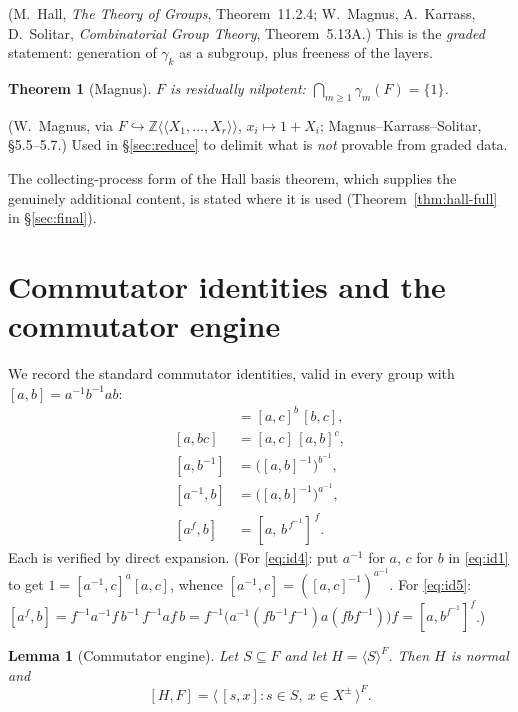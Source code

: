 \documentclass{amsart}
\newtheorem{theorem}{Theorem}
\newtheorem{lemma}{Lemma}
\theoremstyle{definition}
\theoremstyle{remark}
\begin{document}
\noindent
(M.\ Hall, \emph{The Theory of Groups}, Theorem~11.2.4; W.\ Magnus, A.\ Karrass,
D.\ Solitar, \emph{Combinatorial Group Theory}, Theorem~5.13A.) This is the
\emph{graded} statement: generation of $\gamma_k$ as a subgroup, plus freeness of
the layers.

\begin{theorem}[Magnus]\label{thm:magnus}
$F$ is residually nilpotent: $\bigcap_{m\ge1}\gamma_m(F)=\{1\}$.
\end{theorem}

\noindent
(W.\ Magnus, via $F\hookrightarrow\mathbb Z\langle\!\langle X_1,\dots,X_r\rangle
\!\rangle$, $x_i\mapsto 1+X_i$; Magnus--Karrass--Solitar, \S5.5--5.7.) Used in
\S\ref{sec:reduce} to delimit what is \emph{not} provable from graded data.

\noindent
The collecting-process form of the Hall basis theorem, which supplies the
genuinely additional content, is stated where it is used
(Theorem~\ref{thm:hall-full} in \S\ref{sec:final}).

\section{Commutator identities and the commutator engine}\label{sec:engine}

We record the standard commutator identities, valid in every group with
$[a,b]=a^{-1}b^{-1}ab$:
\begin{align}
[ab,c]&=[a,c]^{b}\,[b,c], \label{eq:id1}\\
[a,bc]&=[a,c]\,[a,b]^{c}, \label{eq:id2}\\
[a,b^{-1}]&=\big([a,b]^{-1}\big)^{b^{-1}}, \label{eq:id3}\\
[a^{-1},b]&=\big([a,b]^{-1}\big)^{a^{-1}}, \label{eq:id4}\\
[a^{f},b]&=[a,\,b^{\,f^{-1}}]^{\,f}. \label{eq:id5}
\end{align}
Each is verified by direct expansion. (For \eqref{eq:id4}: put $a^{-1}$ for $a$,
$c$ for $b$ in \eqref{eq:id1} to get $1=[a^{-1},c]^{a}[a,c]$, whence
$[a^{-1},c]=([a,c]^{-1})^{a^{-1}}$. For \eqref{eq:id5}:
$[a^f,b]=f^{-1}a^{-1}f\,b^{-1}\,f^{-1}af\,b
=f^{-1}\big(a^{-1}(fb^{-1}f^{-1})a(fbf^{-1})\big)f=[a,b^{f^{-1}}]^{f}$.)

\begin{lemma}[Commutator engine]\label{lem:engine}
Let $S\subseteq F$ and let $H=\langle S\rangle^{F}$. Then $H$ is normal and
\begin{equation}\label{eq:engine}
[H,F]=\big\langle\,[s,x] : s\in S,\ x\in X^{\pm}\,\big\rangle^{F}.
\end{equation}
\end{lemma}
\end{document}
